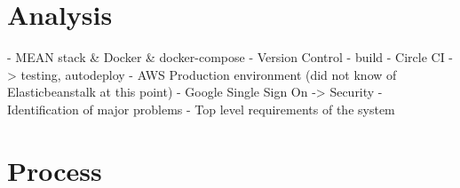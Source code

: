 \section{Analysis}
%
%
%
- MEAN stack \& Docker \& docker-compose
- Version Control
- build - Circle CI -> testing, autodeploy
- AWS Production environment (did not know of Elasticbeanstalk at this point)
- Google Single Sign On -> Security
- Identification of major problems
- Top level requirements of the system


\section{Process}
